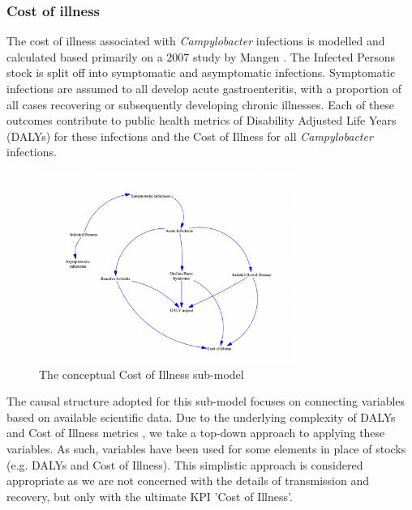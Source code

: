 \subsubsection*{Cost of illness}

The cost of illness associated with \textit{Campylobacter} infections is modelled and calculated based primarily on a 2007 study by Mangen \parencite{mangen_campylobacteriosis_2007}. The Infected Persons stock is split off into symptomatic and asymptomatic infections. Symptomatic infections are assumed to all develop acute gastroenteritis, with a proportion of all cases recovering or subsequently developing chronic illnesses. Each of these outcomes contribute to public health metrics of Disability Adjusted Life Years (DALYs) for these infections and the Cost of Illness for all \textit{Campylobacter} infections. 

\begin{figure}[h]
\centering
\includegraphics[width=0.75\textwidth]{images/COI_submodel.png}
\caption{The conceptual Cost of Illness sub-model}
\end{figure}

The causal structure adopted for this sub-model focuses on connecting variables based on available scientific data. Due to the underlying complexity of DALYs and Cost of Illness metrics \parencite{jo_cost--illness_2014}, we take a top-down approach to applying these variables. As such, variables have been used for some elements in place of stocks (e.g. DALYs and Cost of Illness). This simplistic approach is considered appropriate as we are not concerned with the details of transmission and recovery, but only with the ultimate KPI 'Cost of Illness'. 


